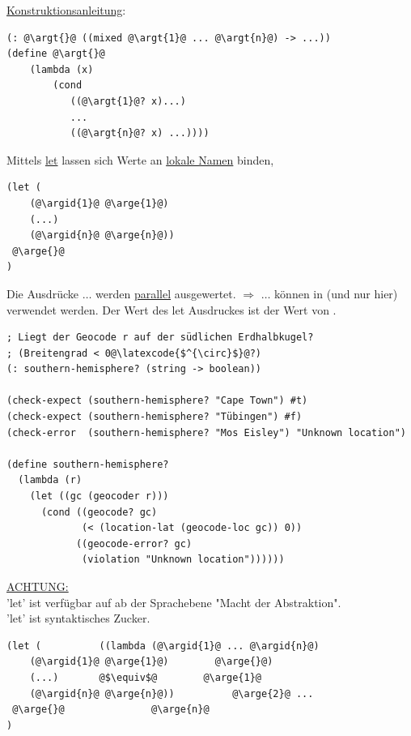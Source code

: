 \underline{Konstruktionsanleitung}:\\
\begin{lstlisting}
(: @\argt{}@ ((mixed @\argt{1}@ ... @\argt{n}@) -> ...))
(define @\argt{}@
	(lambda (x)
		(cond 
		   ((@\argt{1}@? x)...)
		   ...
		   ((@\argt{n}@? x) ...))))
\end{lstlisting}
Mittels \underline{let} lassen sich Werte an \underline{lokale Namen} binden,
\begin{lstlisting}
(let ( 
	(@\argid{1}@ @\arge{1}@)
	(...)
	(@\argid{n}@ @\arge{n}@))
 @\arge{}@
) 
\end{lstlisting}
Die Ausdrücke  $\ldots$  werden \underline{parallel} ausgewertet. $\Rightarrow$  $\ldots$   können in \arge{} (und nur hier) verwendet werden. Der Wert des let Ausdruckes ist der Wert von \arge{}.
\begin{lstlisting}[frame=single]
; Liegt der Geocode r auf der südlichen Erdhalbkugel?
; (Breitengrad < 0@\latexcode{$^{\circ}$}@?)
(: southern-hemisphere? (string -> boolean))

(check-expect (southern-hemisphere? "Cape Town") #t)
(check-expect (southern-hemisphere? "Tübingen") #f)
(check-error  (southern-hemisphere? "Mos Eisley") "Unknown location")

(define southern-hemisphere?
  (lambda (r)
    (let ((gc (geocoder r)))
      (cond ((geocode? gc)  
             (< (location-lat (geocode-loc gc)) 0))
            ((geocode-error? gc) 
             (violation "Unknown location"))))))
\end{lstlisting}
\underline{ACHTUNG:}\\
'let' ist verfügbar auf ab der Sprachebene "Macht der Abstraktion".
\bigskip\\
'let' ist syntaktisches Zucker.
\begin{lstlisting}
(let (			((lambda (@\argid{1}@ ... @\argid{n}@) 
	(@\argid{1}@ @\arge{1}@)		@\arge{}@)
	(...)		@$\equiv$@        @\arge{1}@
	(@\argid{n}@ @\arge{n}@))	       @\arge{2}@ ...
 @\arge{}@			     @\arge{n}@
) 
\end{lstlisting}